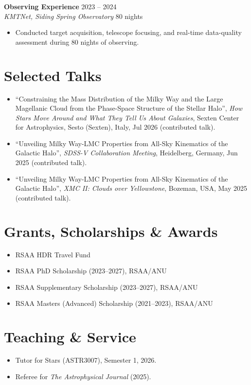 \documentclass[11pt,a4paper]{article}
\newcommand{\cvsection}[1]{\Needspace{4\baselineskip}\section*{#1}}
\newcommand{\cventry}[4]{%
  \noindent\textbf{#1} \hfill #2 \\
  \textit{#3} \hfill #4 \par
}
\begin{document}
\cventry
  {Observing Experience}
  {2023 -- 2024}
  {KMTNet, Siding Spring Observatory}
  {80 nights}

\begin{itemize}
    \item Conducted target acquisition, telescope focusing, and real-time data-quality assessment during 80 nights of observing.
\end{itemize}

\cvsection{Selected Talks}

\begin{itemize}
    \item ``Constraining the Mass Distribution of the Milky Way and the Large Magellanic Cloud from the Phase-Space Structure of the Stellar Halo'', \textit{How Stars Move Around and What They Tell Us About Galaxies}, Sexten Center for Astrophysics, Sesto (Sexten), Italy, Jul 2026 (contributed talk).
    \item ``Unveiling Milky Way-LMC Properties from All-Sky Kinematics of the Galactic Halo'', \textit{SDSS-V Collaboration Meeting}, Heidelberg, Germany, Jun 2025 (contributed talk).
    \item ``Unveiling Milky Way-LMC Properties from All-Sky Kinematics of the Galactic Halo'', \textit{XMC II: Clouds over Yellowstone}, Bozeman, USA, May 2025 (contributed talk).
\end{itemize}

\cvsection{Grants, Scholarships \& Awards}

\begin{itemize}
    \item RSAA HDR Travel Fund
    \item RSAA PhD Scholarship (2023--2027), RSAA/ANU
    \item RSAA Supplementary Scholarship (2023--2027), RSAA/ANU
    \item RSAA Masters (Advanced) Scholarship (2021--2023), RSAA/ANU
\end{itemize}

\cvsection{Teaching \& Service}

\begin{itemize}
    \item Tutor for Stars (ASTR3007), Semester 1, 2026.
    \item Referee for \textit{The Astrophysical Journal} (2025).
\end{itemize}
\end{document}
